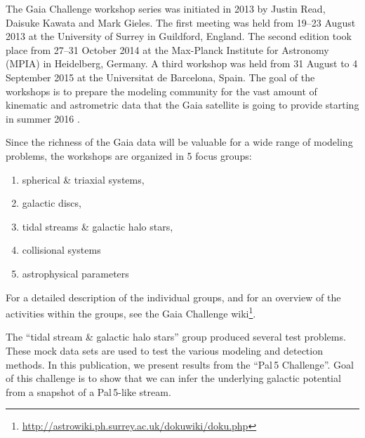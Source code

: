 The Gaia Challenge workshop series was initiated in 2013 by Justin Read, Daisuke Kawata and Mark Gieles. The first meeting was held from 19--23 August 2013 at the University of Surrey in Guildford, England. 
The second edition took place from 27--31 October 2014 at the Max-Planck Institute for Astronomy (MPIA) in Heidelberg, Germany. 
A third workshop was held from 31 August to 4 September 2015 at the Universitat de Barcelona, Spain.
The goal of the workshops is to prepare the modeling community for the vast amount of kinematic and astrometric data that the Gaia satellite is going to provide starting in summer 2016 \citep{Perryman01}.

Since the richness of the Gaia data will be valuable for a wide range of modeling problems, the workshops are organized in 5 focus groups:
\begin{enumerate}
\item spherical \& triaxial systems,
\item galactic discs,
\item tidal streams \& galactic halo stars,
\item collisional systems
\item astrophysical parameters 
\end{enumerate}
For a detailed description of the individual groups, and for an overview of the activities within the groups, see the Gaia Challenge wiki\footnote{\url{http://astrowiki.ph.surrey.ac.uk/dokuwiki/doku.php}}.

The ``tidal stream \& galactic halo stars'' group produced several test problems. These mock data sets are used to test the various modeling and detection methods. In this publication, we present results from the ``Pal\,5 Challenge''. Goal of this challenge is to show that we can infer the underlying galactic potential from a snapshot of a Pal\,5-like stream.